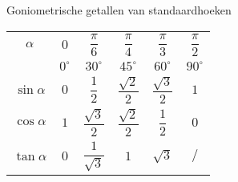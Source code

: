 \documentclass{beamer}
\newcommand{\degree}{^\circ}
\theoremstyle{eigenschap}
\begin{document}
\begin{frame}{Goniometrische getallen van standaardhoeken}

{\centering	
		
	\renewcommand{\arraystretch}{3}
	\begin{tabular}{|c || c | c | c | c | c |}
		\hline
		$\alpha$  & \quad$0$ \quad & \quad$\dfrac{\pi}{6}$ \quad&\quad $\dfrac{\pi}{4}$\quad &\quad $\dfrac{\pi}{3}$ \quad& \quad $\dfrac{\pi}{2}$ \quad \\ 
		          & \quad$0\degree$ \quad & \quad$30\degree$ \quad&\quad $45\degree$\quad &\quad $60\degree$ \quad& \quad $90\degree$ \quad \\ \hline

		$\sin\alpha$ & $0$ & $\dfrac{1}{2}$  & $\dfrac{\sqrt{2}}{2}$ & $\dfrac{\sqrt{3}}{2}$  & $1$ \\ \hline
		$\cos\alpha$ & $1$ & $\dfrac{\sqrt{3}}{2}$  & $\dfrac{\sqrt{2}}{2}$  & $\dfrac{1}{2}$ & $0$ \\ \hline
		$\tan\alpha$ & $0$ & $\dfrac{1}{\sqrt{3}}$ & $1$ & $\sqrt{3}$& $/$\\ \hline
		\hline
	\end{tabular} 
}
\end{frame}

\newcommand{\mydot}{node [color=black,circle,fill,inner sep=2pt,scale=0.5] {}}
\end{document}
